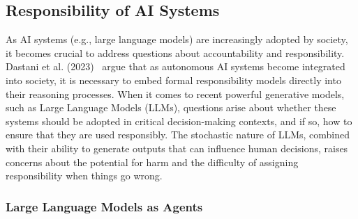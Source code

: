 \documentclass{article}
\begin{document}
\subsection{Responsibility of AI Systems}


As AI systems (e.g., large language models) are increasingly adopted by society, it becomes crucial to address questions about accountability and responsibility. Dastani et al. (2023)~\cite{dastani_responsibility_2023} argue that as autonomous AI systems become integrated into society, it is necessary to embed formal responsibility models directly into their reasoning processes. When it comes to recent powerful generative models, such as Large Language Models (LLMs), questions arise about whether these systems should be adopted in critical decision-making contexts, and if so, how to ensure that they are used responsibly. The stochastic nature of LLMs, combined with their ability to generate outputs that can influence human decisions, raises concerns about the potential for harm and the difficulty of assigning responsibility when things go wrong.

\subsubsection{Large Language Models as Agents}

\end{document}
